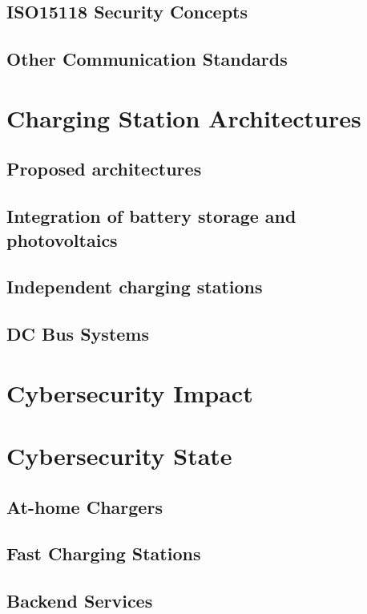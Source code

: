 \documentclass[conference,flushend]{iaria} %
\begin{document}
\subsection{ISO15118 Security Concepts}
\subsection{Other Communication Standards}

\section{Charging Station Architectures}
\subsection{Proposed architectures}
\subsection{Integration of battery storage and photovoltaics}
\subsection{Independent charging stations}
\subsection{DC Bus Systems}

\section{Cybersecurity Impact}

\section{Cybersecurity State}
\subsection{At-home Chargers}
\subsection{Fast Charging Stations}
\subsection{Backend Services}

\printbibliography
\end{document}
